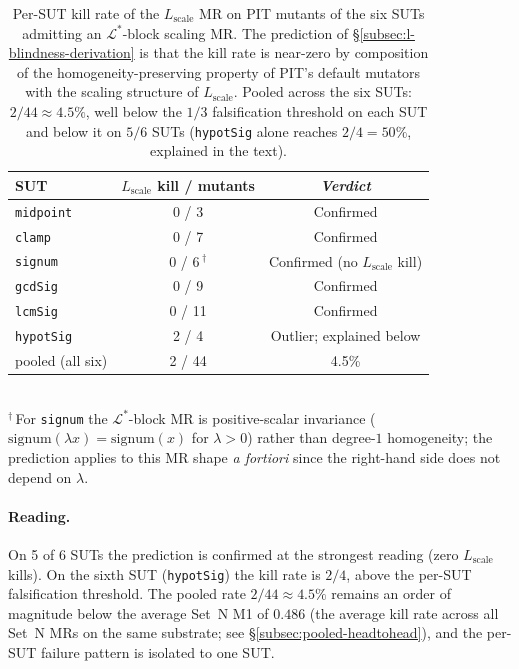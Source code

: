 \documentclass[acmsmall, screen]{acmart}
\begin{document}
\begin{table}[h]
\centering
\caption{Per-SUT kill rate of the $L_{\mathrm{scale}}$ MR on PIT
mutants of the six SUTs admitting an $\mathcal{L}^{*}$-block scaling
MR. The prediction of \S\ref{subsec:l-blindness-derivation} is that
the kill rate is near-zero by composition of the
homogeneity-preserving property of PIT's default mutators with the
scaling structure of $L_{\mathrm{scale}}$. Pooled across the six SUTs:
$2/44 \approx 4.5\%$, well below the $1/3$ falsification threshold on
each SUT and below it on $5/6$ SUTs (\texttt{hypotSig} alone reaches
$2/4 = 50\%$, explained in the text).}
\label{tab:l-blindness}
\small
\begin{tabular}{lcc}
\toprule
SUT & $L_{\mathrm{scale}}$ kill / mutants & \emph{Verdict} \\
\midrule
\texttt{midpoint}  &  0 / 3   & Confirmed \\
\texttt{clamp}     &  0 / 7   & Confirmed \\
\texttt{signum}    &  0 / 6\,$^{\dagger}$ & Confirmed (no $L_{\mathrm{scale}}$ kill) \\
\texttt{gcdSig}    &  0 / 9   & Confirmed \\
\texttt{lcmSig}    &  0 / 11  & Confirmed \\
\texttt{hypotSig}  &  2 / 4   & Outlier; explained below \\
\midrule
pooled (all six)   &  2 / 44   & 4.5\% \\
\bottomrule
\end{tabular}\\[0.4em]
{\footnotesize $^{\dagger}$\,For \texttt{signum} the $\mathcal{L}^{*}$-block MR
is positive-scalar invariance ($\mathrm{signum}(\lambda x) = \mathrm{signum}(x)$
for $\lambda > 0$) rather than degree-$1$ homogeneity; the prediction
applies to this MR shape \emph{a fortiori} since the right-hand side
does not depend on $\lambda$.}
\end{table}

\paragraph{Reading.}
On 5 of 6 SUTs the prediction is confirmed at the strongest reading
(zero $L_{\mathrm{scale}}$ kills). On the sixth SUT
(\texttt{hypotSig}) the kill rate is $2/4$, above the per-SUT
falsification threshold. The pooled rate $2/44 \approx 4.5\%$ remains
an order of magnitude below the average Set~N M1 of $0.486$ (the
average kill rate across all Set~N MRs on the same substrate; see
\S\ref{subsec:pooled-headtohead}), and the per-SUT failure pattern is
isolated to one SUT.
\end{document}
